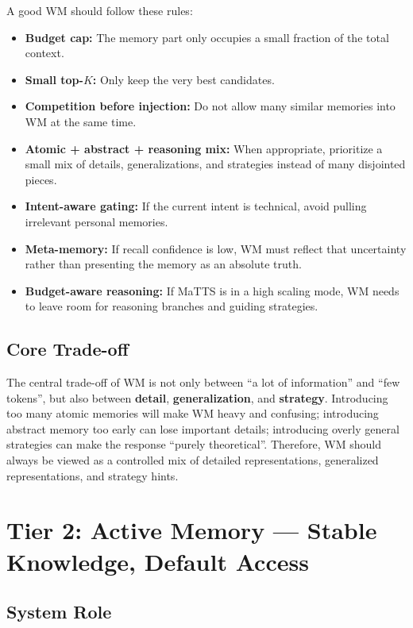 \documentclass[a4paper,12pt]{article}
\begin{document}
A good WM should follow these rules:
\begin{itemize}
    \item \textbf{Budget cap:} The memory part only occupies a small fraction of the total context.
    \item \textbf{Small top-$K$:} Only keep the very best candidates.
    \item \textbf{Competition before injection:} Do not allow many similar memories into WM at the same time.
    \item \textbf{Atomic + abstract + reasoning mix:} When appropriate, prioritize a small mix of details, generalizations, and strategies instead of many disjointed pieces.
    \item \textbf{Intent-aware gating:} If the current intent is technical, avoid pulling irrelevant personal memories.
    \item \textbf{Meta-memory:} If recall confidence is low, WM must reflect that uncertainty rather than presenting the memory as an absolute truth.
    \item \textbf{Budget-aware reasoning:} If MaTTS is in a high scaling mode, WM needs to leave room for reasoning branches and guiding strategies.
\end{itemize}

\subsection*{Core Trade-off}

The central trade-off of WM is not only between ``a lot of information'' and ``few tokens'', but also between \textbf{detail}, \textbf{generalization}, and \textbf{strategy}. Introducing too many atomic memories will make WM heavy and confusing; introducing abstract memory too early can lose important details; introducing overly general strategies can make the response ``purely theoretical''. Therefore, WM should always be viewed as a controlled mix of detailed representations, generalized representations, and strategy hints.

\section{Tier 2: Active Memory --- Stable Knowledge, Default Access}

\subsection*{System Role}
\end{document}

